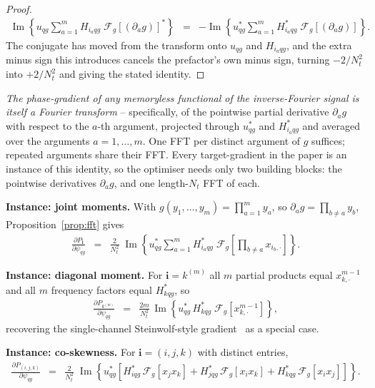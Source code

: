 \documentclass[10pt,a4paper]{article}
\numberwithin{equation}{section}
\newcommand{\block}[1]{\left[#1\right]}
\newcommand{\mat}[1]{\left(#1\right)}
\newcommand{\im}[1]{\operatorname{Im}\left\{#1\right\}}
\begin{document}
\begin{proof}
\begin{eqnarray}
\im{u_{q g} \sum_{a=1}^{m} H_{i_a q g}\;\mathcal{F}_g\block{\mat{\partial_a g}}^{*}}
	&=& -\im{u_{q g}^{*} \sum_{a=1}^{m} H_{i_a q g}^{*}\;\mathcal{F}_g\block{\mat{\partial_a g}}}.
\end{eqnarray}
The conjugate has moved from the transform onto $u_{qg}$ and $H_{i_a qg}$, and the extra minus sign this introduces cancels the prefactor's own minus sign, turning $-2/N_t^2$ into $+2/N_t^2$ and giving the stated identity.
\end{proof}

\emph{The phase-gradient of any memoryless functional of the inverse-Fourier signal is itself a Fourier transform} -- specifically, of the pointwise partial derivative $\partial_a g$ with respect to the $a$-th argument, projected through $u_{q g}^*$ and $H_{i_a q g}^*$ and averaged over the arguments $a=1,\ldots,m$. One FFT per distinct argument of $g$ suffices; repeated arguments share their FFT. Every target-gradient in the paper is an instance of this identity, so the optimiser needs only two building blocks: the pointwise derivatives $\partial_a g$, and one length-$N_t$ FFT of each.

\textbf{Instance: joint moments.} With $g\mat{y_1,\ldots,y_m} = \prod_{a=1}^{m} y_a$, so $\partial_a g = \prod_{b\neq a} y_b$, Proposition~\ref{prop:fft} gives
\begin{eqnarray}
\frac{\partial P_\mathbf{i}}{\partial \psi_{q g}}
	&=& \frac{2}{N_t^2}\;\im{u_{q g}^* \sum_{a=1}^{m} H_{i_a q g}^*\;\mathcal{F}_g\block{\prod_{b\neq a} x_{i_b,\cdot}}}.
\end{eqnarray}

\textbf{Instance: diagonal moment.} For $\mathbf{i} = k^{(m)}$ all $m$ partial products equal $x_{k,\cdot}^{m-1}$ and all $m$ frequency factors equal $H_{k q g}^*$, so
\begin{eqnarray}
\frac{\partial P_{k^{(m)}}}{\partial \psi_{q g}} &=& \frac{2 m}{N_t^2}\,\im{u_{q g}^*\, H_{k q g}^*\;\mathcal{F}_g\block{x_{k,\cdot}^{m-1}}},
\end{eqnarray}
recovering the single-channel Steinwolf-style gradient~\cite{steinwolf2011ifft} as a special case.

\textbf{Instance: co-skewness.} For $\mathbf{i}=(i,j,k)$ with distinct entries,
\begin{eqnarray}
\frac{\partial P_{(i,j,k)}}{\partial \psi_{q g}} &=& \frac{2}{N_t^2}\;\im{u_{q g}^*\block{H_{i q g}^*\,\mathcal{F}_g\block{x_j x_k} + H_{j q g}^*\,\mathcal{F}_g\block{x_i x_k} + H_{k q g}^*\,\mathcal{F}_g\block{x_i x_j}}}.
\end{eqnarray}
\end{document}
